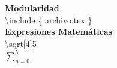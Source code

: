 \begin{frame}{}
    \textbf{Modularidad} \\
    \textbackslash include \{ archivo.tex \}\\
    \vspace{1.7cm}
    \textbf{Expresiones Matemáticas}\\
    \textbackslash sqrt[4]{5}\\
    \vspace{1.0cm}
    $\sum_{n=0}^5$
    
\end{frame}